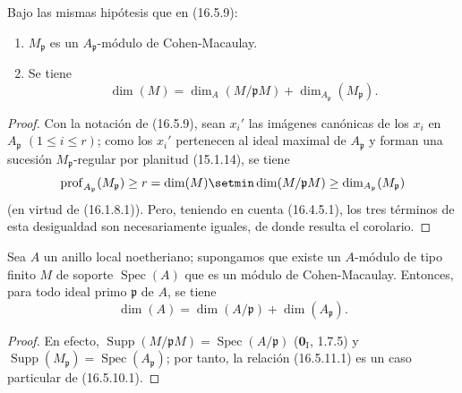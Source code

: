 \begin{corollary}[16.5.10]
\label{0.16.5.10-fr}
Bajo las mismas hipótesis que en \textup{(16.5.9)}:
\begin{enumerate}
  \item[\textup{(i)}] $M_{\mathfrak{p}}$ es un $A_{\mathfrak{p}}$-módulo de
  Cohen-Macaulay.
  \item[\textup{(ii)}] Se tiene
  \begin{equation}
  \label{0.16.5.10.1-fr}
  \tag{16.5.10.1}
    \dim(M)=\dim_A(M/\mathfrak{p}M)
    +\dim_{A_{\mathfrak{p}}}(M_{\mathfrak{p}}).
  \end{equation}
\end{enumerate}
\end{corollary}

\begin{proof}
Con la notación de (16.5.9), sean $x_i'$ las imágenes canónicas de los $x_i$
en $A_{\mathfrak{p}}$ $(1\leq i\leq r)$; como los $x_i'$ pertenecen al
ideal maximal de $A_{\mathfrak{p}}$ y forman una sucesión
$M_{\mathfrak{p}}$-regular por planitud (15.1.14), se tiene
\[
  \operatorname{prof}_{A_{\mathfrak{p}}}(M_{\mathfrak{p}})
  \geq r=\dim(M)\setmin\dim(M/\mathfrak{p}M)
  \geq\dim_{A_{\mathfrak{p}}}(M_{\mathfrak{p}})
\]
(en virtud de (16.1.8.1)). Pero, teniendo en cuenta (16.4.5.1), los tres
términos de esta desigualdad son necesariamente iguales, de donde resulta el corolario.
\end{proof}


\begin{corollary}[16.5.11]
\label{0.16.5.11-fr}
Sea $A$ un anillo local noetheriano; supongamos que existe un $A$-módulo de
tipo finito $M$ de soporte $\operatorname{Spec}(A)$ que es un módulo de
Cohen-Macaulay. Entonces, para todo ideal primo $\mathfrak{p}$ de $A$, se tiene
\begin{equation}
\label{0.16.5.11.1-fr}
\tag{16.5.11.1}
  \dim(A)=\dim(A/\mathfrak{p})+\dim(A_{\mathfrak{p}}).
\end{equation}
\end{corollary}

\begin{proof}
En efecto, $\operatorname{Supp}(M/\mathfrak{p}M)
=\operatorname{Spec}(A/\mathfrak{p})$ ($\mathbf{0}_{\mathrm I}$, 1.7.5) y
$\operatorname{Supp}(M_{\mathfrak{p}})
=\operatorname{Spec}(A_{\mathfrak{p}})$; por tanto, la relación (16.5.11.1) es un
caso particular de (16.5.10.1).
\end{proof}

